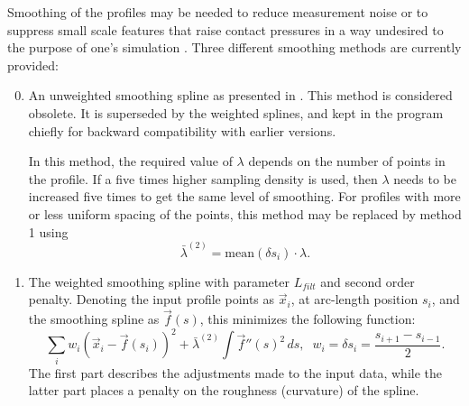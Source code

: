 \documentclass[12pt]{report}
\begin{document}
Smoothing of the profiles may be needed to reduce measurement noise or to
suppress small scale features that raise contact pressures in a way
undesired to the purpose of one's simulation \cite{Vollebregt2022b-cm2022}.
Three different smoothing methods are currently provided:
\begin{enumerate}\setcounter{enumi}{-1}
\item An unweighted smoothing spline as presented in
        \cite{Vollebregt2020b-wrgeom}. This method is considered obsolete.
        It is superseded by the weighted splines, and kept in the program 
        chiefly for backward compatibility with earlier versions. 

        In this method, the required value of $\lambda$ depends on the
        number of points in the profile. If a five times higher sampling
        density is used, then $\lambda$ needs to be increased five times
        to get the same level of smoothing. For profiles with more or less
        uniform spacing of the points, this method may be replaced by method 1
        using
\begin{equation}
        \bar{\lambda}^{(2)}=\mathrm{mean}(\delta s_i)\cdot \lambda .
\end{equation}
\item The weighted smoothing spline with parameter $L_{filt}$ and second
        order penalty. Denoting the input profile points as $\vec{x}_i$,
        at arc-length position $s_i$, and the smoothing spline as
        $\vec{f}(s)$, this minimizes the following function:
\begin{equation}
   \sum_i w_i \left( \vec{x}_i - \vec{f}(s_i) \right)^2 + 
                \bar{\lambda}^{(2)} \int \vec{f}''(s)^2 \, ds , \;\;
        w_i = \delta s_i = \frac{s_{i+1}-s_{i-1}}{2} .
\end{equation}
        The first part describes the adjustments made to the input data,
        while the latter part places a penalty on the roughness (curvature)
        of the spline. 


\end{enumerate}
\end{document}
